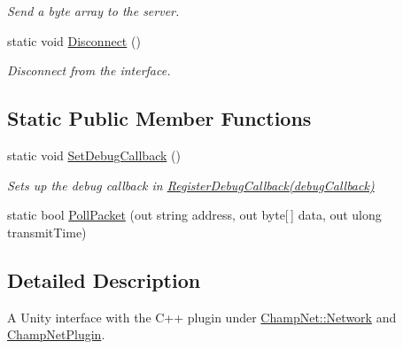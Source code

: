 \begin{DoxyCompactItemize}
\begin{DoxyCompactList}\small\item\em Send a byte array to the server. \end{DoxyCompactList}\item 
\hypertarget{class_champ_net_plugin_1_1_network_a7f6c434b9b5587b34bd8a3f0d25488c4}{static void \hyperlink{class_champ_net_plugin_1_1_network_a7f6c434b9b5587b34bd8a3f0d25488c4}{Disconnect} ()}\label{class_champ_net_plugin_1_1_network_a7f6c434b9b5587b34bd8a3f0d25488c4}

\begin{DoxyCompactList}\small\item\em Disconnect from the interface. \end{DoxyCompactList}\end{DoxyCompactItemize}
\subsection*{Static Public Member Functions}
\begin{DoxyCompactItemize}
\item 
static void \hyperlink{class_champ_net_plugin_1_1_network_ad01cdffbb961d7aee298ad1a03e1047b}{Set\-Debug\-Callback} ()
\begin{DoxyCompactList}\small\item\em Sets up the debug callback in \hyperlink{class_champ_net_plugin_1_1_network_a33f8a1666e92815fc3968ad98fd3f782}{Register\-Debug\-Callback(debug\-Callback)} \end{DoxyCompactList}\item 
static bool \hyperlink{class_champ_net_plugin_1_1_network_a3d42caa51e4fdc73edb33057cd34896b}{Poll\-Packet} (out string address, out byte\mbox{[}$\,$\mbox{]} data, out ulong transmit\-Time)
\end{DoxyCompactItemize}


\subsection{Detailed Description}
A Unity interface with the C++ plugin under \hyperlink{class_champ_net_1_1_network}{Champ\-Net\-::\-Network} and \hyperlink{namespace_champ_net_plugin}{Champ\-Net\-Plugin}. 



